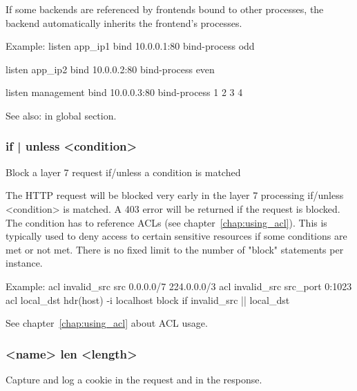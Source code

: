   If some backends are referenced by frontends bound to other processes, the
  backend automatically inherits the frontend's processes.

  \begin{example}{Example:}
        listen app_ip1
            bind 10.0.0.1:80
            bind-process odd

        listen app_ip2
            bind 10.0.0.2:80
            bind-process even

        listen management
            bind 10.0.0.3:80
            bind-process 1 2 3 4
  \end{example}

  See also:  in global section.

\subsubsection[block]{ { if | unless } <condition>}
  Block a layer 7 request if/unless a condition is matched


  The HTTP request will be blocked very early in the layer 7 processing
  if/unless <condition> is matched. A 403 error will be returned if the request
  is blocked. The condition has to reference ACLs (see chapter~\ref{chap:using_acl}). This is
  typically used to deny access to certain sensitive resources if some
  conditions are met or not met. There is no fixed limit to the number of
  "block" statements per instance.

  \begin{example}{Example:}
        acl invalid_src  src          0.0.0.0/7 224.0.0.0/3
        acl invalid_src  src_port     0:1023
        acl local_dst    hdr(host) -i localhost
        block if invalid_src || local_dst
  \end{example}

  See chapter~\ref{chap:using_acl} about ACL usage.

\subsubsection[capture cookie]{ <name> len <length>}
  Capture and log a cookie in the request and in the response.

                                  
